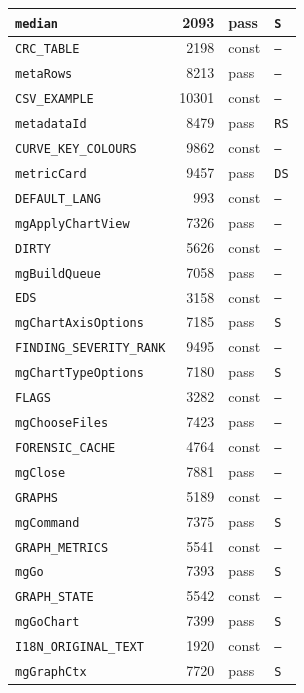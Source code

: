 {\begin{xltabular}{\linewidth}{|l|r|X|X|}
\texttt{median} & 2093 & pass & \texttt{S} \\ \hline
\texttt{CRC\_TABLE} & 2198 & const & \texttt{--} \\ \hline
\texttt{metaRows} & 8213 & pass & \texttt{--} \\ \hline
\texttt{CSV\_EXAMPLE} & 10301 & const & \texttt{--} \\ \hline
\texttt{metadataId} & 8479 & pass & \texttt{RS} \\ \hline
\texttt{CURVE\_KEY\_COLOURS} & 9862 & const & \texttt{--} \\ \hline
\texttt{metricCard} & 9457 & pass & \texttt{DS} \\ \hline
\texttt{DEFAULT\_LANG} & 993 & const & \texttt{--} \\ \hline
\texttt{mgApplyChartView} & 7326 & pass & \texttt{--} \\ \hline
\texttt{DIRTY} & 5626 & const & \texttt{--} \\ \hline
\texttt{mgBuildQueue} & 7058 & pass & \texttt{--} \\ \hline
\texttt{EDS} & 3158 & const & \texttt{--} \\ \hline
\texttt{mgChartAxisOptions} & 7185 & pass & \texttt{S} \\ \hline
\texttt{FINDING\_SEVERITY\_RANK} & 9495 & const & \texttt{--} \\ \hline
\texttt{mgChartTypeOptions} & 7180 & pass & \texttt{S} \\ \hline
\texttt{FLAGS} & 3282 & const & \texttt{--} \\ \hline
\texttt{mgChooseFiles} & 7423 & pass & \texttt{--} \\ \hline
\texttt{FORENSIC\_CACHE} & 4764 & const & \texttt{--} \\ \hline
\texttt{mgClose} & 7881 & pass & \texttt{--} \\ \hline
\texttt{GRAPHS} & 5189 & const & \texttt{--} \\ \hline
\texttt{mgCommand} & 7375 & pass & \texttt{S} \\ \hline
\texttt{GRAPH\_METRICS} & 5541 & const & \texttt{--} \\ \hline
\texttt{mgGo} & 7393 & pass & \texttt{S} \\ \hline
\texttt{GRAPH\_STATE} & 5542 & const & \texttt{--} \\ \hline
\texttt{mgGoChart} & 7399 & pass & \texttt{S} \\ \hline
\texttt{I18N\_ORIGINAL\_TEXT} & 1920 & const & \texttt{--} \\ \hline
\texttt{mgGraphCtx} & 7720 & pass & \texttt{S} \\ \hline

\end{xltabular}}
